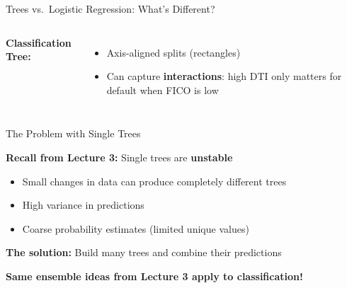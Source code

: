 \documentclass[10pt]{beamer}
\newcommand{\highlight}[1]{\textcolor{AccentOrange}{\textbf{#1}}}
\begin{document}
\begin{frame}{Trees vs.\ Logistic Regression: What's Different?}
\begin{columns}[T]
    \textbf{Classification Tree:}
    \begin{itemize}
      \item Axis-aligned splits (rectangles)
      \item Can capture \highlight{interactions}: high DTI only matters for default when FICO is low
    \end{itemize}
  \end{columns}
\end{frame}


\begin{frame}{The Problem with Single Trees}

  \textbf{Recall from Lecture 3:} Single trees are \highlight{unstable}

  \vspace{1em}
  \begin{itemize}
    \item Small changes in data can produce completely different trees
    \item High variance in predictions
    \item Coarse probability estimates (limited unique values)
  \end{itemize}

  \vspace{1em}
  \textbf{The solution:} Build many trees and combine their predictions

  \vspace{0.5em}
  \begin{center}
  \end{center}

  \vspace{0.5em}
  \textbf{Same ensemble ideas from Lecture 3 apply to classification!}
\end{frame}
\end{document}

